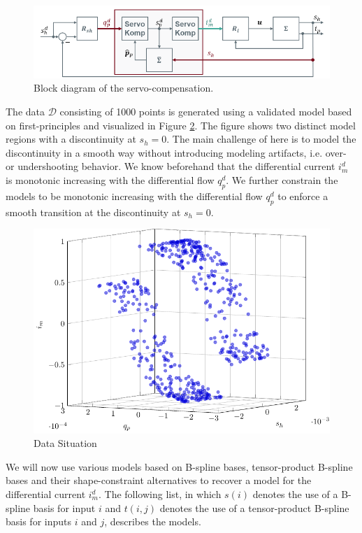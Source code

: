 \begin{figure}[H]
	\centering
	\includegraphics[width=0.8\columnwidth]{graphics/pgfplots/cha6/blockschaltbild.png}
	\caption{Block diagram of the servo-compensation.}
	\label{fig:blockschaltbild}
\end{figure}

The data $\mathcal{D}$ consisting of 1000 points is generated using a validated model based on first-principles and visualized in Figure \ref{fig:bosch_data_situation}. The figure shows two distinct model regions with a discontinuity at $s_h = 0$. The main challenge of here is to model the discontinuity in a smooth way without introducing modeling artifacts, i.e. over- or undershooting behavior. We know beforehand that the differential current $i_m^d$ is monotonic increasing with the differential flow $q_p^d$. We further constrain the models to be monotonic increasing with the differential flow $q_p^d$ to enforce a smooth transition at the discontinuity at $s_h = 0$.

\begin{figure}[H]
	\centering
	\includegraphics[width=0.8\columnwidth]{graphics/pgfplots/cha6/data_situation.pdf} 
	\caption{Data Situation}
	\label{fig:bosch_data_situation}
\end{figure}

We will now use various models based on B-spline bases, tensor-product B-spline bases and their shape-constraint alternatives to recover a model for the differential current $i_m^d$. The following list, in which $s(i)$ denotes the use of a B-spline basis for input $i$ and $t(i,j)$ denotes the use of a tensor-product B-spline basis for inputs $i$ and $j$, describes the models.

